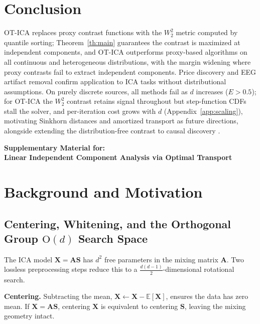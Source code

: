 \documentclass[accepted]{tpm2026} %
\begin{document}
\section{Conclusion}\label{sec:conclusion}
OT-ICA replaces proxy contrast functions with the $W_2^2$ metric computed by quantile sorting; Theorem~\ref{th:main} guarantees the
contrast is maximized at independent components, and OT-ICA outperforms proxy-based algorithms on all continuous and heterogeneous
distributions, with the margin widening where proxy contrasts fail to extract independent components. Price discovery and EEG
artifact removal confirm application to ICA tasks without distributional assumptions. On purely discrete sources, all methods fail
as $d$ increases ($E > 0.5$); for OT-ICA the $W_2^2$ contrast retains signal throughout but step-function CDFs stall the solver, and
per-iteration cost grows with $d$ (Appendix~\ref{app:scaling}), motivating Sinkhorn distances \citep{cuturi2013sinkhorn, peyre2019computational}
and amortized transport as future directions, alongside extending the distribution-free contrast to causal discovery
\citep{shimizu2006linear, liang2023causal, buchholz2022function}.



\newpage
\onecolumn
\appendix

\begin{center}
    \Large\textbf{Supplementary Material for:}\\
    \large\textbf{Linear Independent Component Analysis via Optimal Transport}
\end{center}

\section{Background and Motivation}
\label{app:info_geometry}

\subsection{Centering, Whitening, and the Orthogonal Group $\mathrm{O}(d)$ Search Space}

The ICA model $\mathbf{X} = \mathbf{A}\mathbf{S}$ has $d^2$ free parameters in the mixing matrix $\mathbf{A}$.
Two lossless preprocessing steps reduce this to a $\tfrac{d(d-1)}{2}$-dimensional rotational search.

\textbf{Centering.} Subtracting the mean, $\mathbf{X} \gets \mathbf{X} - \mathbb{E}[\mathbf{X}]$, ensures the data has zero mean.
If $\mathbf{X} = \mathbf{A}\mathbf{S}$, centering $\mathbf{X}$ is equivalent to centering $\mathbf{S}$, leaving the mixing geometry intact.
\end{document}
